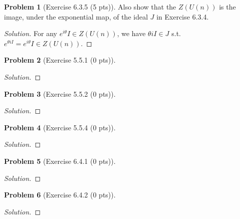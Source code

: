 \documentclass{article}
\theoremstyle{definition}
\newtheorem{problem}{Problem}
\theoremstyle{plain}
\begin{document}
\begin{problem}[Exercise 6.3.5 (5 pts)]
Also show that the $Z(U(n))$ is the image, under the exponential map, of the ideal $J$ in Exercise 6.3.4.
\end{problem}
\begin{adjustwidth}{0.7cm}{}
\color{blue}
\begin{proof}[Solution]
For any $e^{i\theta}I\in Z(U(n))$, we have $\theta iI\in J$ s.t. $e^{\theta iI}=e^{i\theta}I\in Z(U(n))$.
\color{black}
\end{proof}
\end{adjustwidth}

\begin{problem}[Exercise 5.5.1 (0 pts)]
\end{problem}
\begin{adjustwidth}{0.7cm}{}
\color{blue}
\begin{proof}[Solution]
\color{black}
\end{proof}
\end{adjustwidth}

\begin{problem}[Exercise 5.5.2 (0 pts)]
\end{problem}
\begin{adjustwidth}{0.7cm}{}
\color{blue}
\begin{proof}[Solution]
\color{black}
\end{proof}
\end{adjustwidth}

\begin{problem}[Exercise 5.5.4 (0 pts)]
\end{problem}
\begin{adjustwidth}{0.7cm}{}
\color{blue}
\begin{proof}[Solution]
\color{black}
\end{proof}
\end{adjustwidth}

\begin{problem}[Exercise 6.4.1 (0 pts)]
\end{problem}
\begin{adjustwidth}{0.7cm}{}
\color{blue}
\begin{proof}[Solution]
\color{black}
\end{proof}
\end{adjustwidth}

\begin{problem}[Exercise 6.4.2 (0 pts)]
\end{problem}
\begin{adjustwidth}{0.7cm}{}
\color{blue}
\begin{proof}[Solution]
\color{black}
\end{proof}
\end{adjustwidth}
\end{document}
